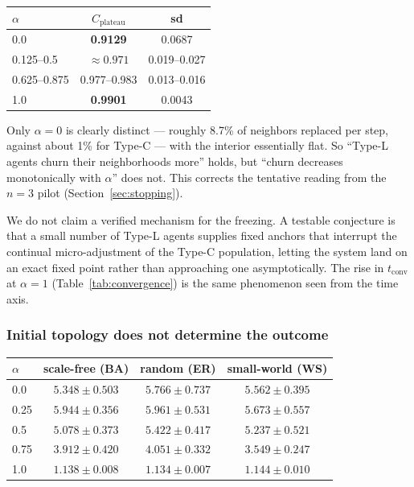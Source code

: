 \begin{center}
\begin{tabular}{lcc}
\toprule
$\alpha$ & $C_{\mathrm{plateau}}$ & sd \\
\midrule
0.0          & \textbf{0.9129} & 0.0687 \\
0.125--0.5   & $\approx 0.971$ & 0.019--0.027 \\
0.625--0.875 & 0.977--0.983    & 0.013--0.016 \\
1.0          & \textbf{0.9901} & 0.0043 \\
\bottomrule
\end{tabular}
\end{center}

Only $\alpha = 0$ is clearly distinct --- roughly 8.7\% of neighbors replaced per step,
against about 1\% for Type-C --- with the interior essentially flat. So ``Type-L agents
churn their neighborhoods more'' holds, but ``churn decreases monotonically with
$\alpha$'' does not. This corrects the tentative reading from the $n = 3$ pilot
(Section~\ref{sec:stopping}).

We do not claim a verified mechanism for the freezing. A testable conjecture is that a
small number of Type-L agents supplies fixed anchors that interrupt the continual
micro-adjustment of the Type-C population, letting the system land on an exact fixed
point rather than approaching one asymptotically. The rise in $t_{\mathrm{conv}}$ at
$\alpha = 1$ (Table~\ref{tab:convergence}) is the same phenomenon seen from the time axis.

\subsubsection{Initial topology does not determine the outcome}
\label{sec:res-topology}

\begin{center}
\begin{tabular}{lccc}
\toprule
$\alpha$ & scale-free (BA) & random (ER) & small-world (WS) \\
\midrule
0.0  & $5.348 \pm 0.503$ & $5.766 \pm 0.737$ & $5.562 \pm 0.395$ \\
0.25 & $5.944 \pm 0.356$ & $5.961 \pm 0.531$ & $5.673 \pm 0.557$ \\
0.5  & $5.078 \pm 0.373$ & $5.422 \pm 0.417$ & $5.237 \pm 0.521$ \\
0.75 & $3.912 \pm 0.420$ & $4.051 \pm 0.332$ & $3.549 \pm 0.247$ \\
1.0  & $1.138 \pm 0.008$ & $1.134 \pm 0.007$ & $1.144 \pm 0.010$ \\
\bottomrule
\end{tabular}
\end{center}

